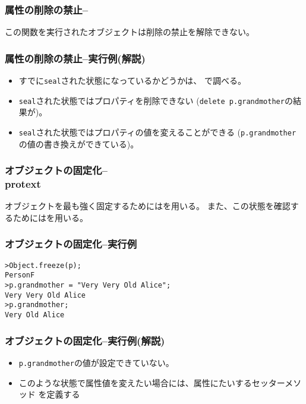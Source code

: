 \begin{frame}[containsverbatim]
 \frametitle{属性の削除の禁止--\protect{}}
 この関数を実行されたオブジェクトは削除の禁止を解除できない。
\begin{frame}[containsverbatim]
 \frametitle{属性の削除の禁止--実行例(解説)}
\begin{itemize}
	 \item すでに\texttt{seal}された状態になっているかどうかは、
				 で調べる。
 \item \texttt{seal}された状態ではプロパティを削除できない
			 (\texttt{delete p.grandmother}の結果が)。
 \item \texttt{seal}された状態ではプロパティの値を変えることができる
			 (\texttt{p.grandmother}の値の書き換えができている)。
\end{itemize}
\end{frame}
\begin{frame}[containsverbatim]
 \frametitle{オブジェクトの固定化--\\protext{}}
オブジェクトを最も強く固定するためにはを用いる。
また、この状態を確認するためにはを用いる。\end{frame}
\begin{frame}[containsverbatim]
 \frametitle{オブジェクトの固定化--実行例}
\begin{Verbatim}
>Object.freeze(p);
PersonF
>p.grandmother = "Very Very Old Alice";
Very Very Old Alice
>p.grandmother;
Very Old Alice
\end{Verbatim}
\end{frame}
\begin{frame}[containsverbatim]
 \frametitle{オブジェクトの固定化--実行例(解説)}
 \begin{itemize}
  \item \texttt{p.grandmother}の値が設定できていない。
  \item このような状態で属性値を変えたい場合には、属性にたいするセッターメソッド
  を定義する
 \end{itemize}
\end{frame}

\end{frame}

